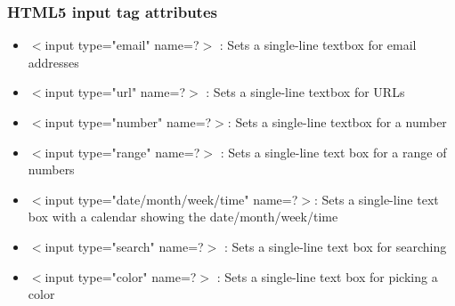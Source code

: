 \documentclass{beamer}
\begin{document}
\begin{frame}
\frametitle{HTML5 input tag attributes  }
\begin{itemize}
  \item   $<$input type="email" name=?$>$ :                Sets a single-line textbox for email addresses 
 \item  $<$input type="url" name=?$>$ :     Sets a single-line textbox for URLs 
 \item  $<$input type="number" name=?$>$:      Sets a single-line textbox for a number 
 \item  $<$input type="range" name=?$>$ :    Sets a single-line text box for a range of numbers 
 \item  $<$input type="date/month/week/time" name=?$>$:      Sets a single-line text box with a calendar  
     showing the date/month/week/time 
 \item  $<$input type="search" name=?$>$ :      Sets a single-line text box for searching 
 \item  $<$input type="color" name=?$>$ :      Sets a single-line text box for picking a color
\end{itemize}
\end{frame}
\end{document}
